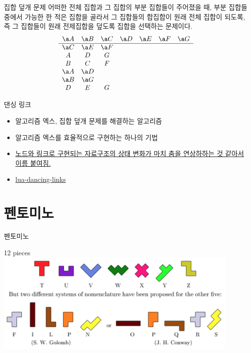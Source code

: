 \documentclass[xcolor=svgnames]{beamer}
\begin{document}
\renewcommand\arraystretch{1.1}
%
\begin{frame}{집합 덮개 문제}
  어떠한 전체 집합과 그 집합의 부분 집합들이 주어졌을 때, 부분 집합들 중에서 가능한 한
  적은 집합을 골라서 그 집합들의 합집합이 원래 전체 집합이 되도록, 즉 그 집합들이
  원래 전제집합을 \alert{덮도록} 집합을 선택하는 문제이다.
  {\large\boldmath
  $$
  \begin{array}{ccccccc}
    \a A & \a B & \a C & \a D & \a E & \a F & \a G\\
    \hline
    \a C & \a E & \a F &&&&\\
    A & D & G &&&&\\
    B & C & F &&&&\\
    \a A & \a D &&&&&\\
    \a B & \a G &&&&&\\
    D & E & G &&&&
  \end{array}
  $$}
\end{frame}

%
\begin{frame}{댄싱 링크}
  \begin{itemize}
  \item \alert{알고리즘 엑스}, 집합 덮개 문제를 해결하는 알고리즘
  \item 알고리즘 엑스를 효율적으로 구현하는 하나의 기법
  \item \href{https://www.youtube.com/watch?v=pN76VICZiKU&start=100}
    {노드와 링크로 구현되는 자료구조의 상태 변화가 마치 춤을 연상하하는 것 같아서
    이름 붙여짐.}
  \item \href{https://github.com/sjnam/lua-dancing-links}
    {lua-dancing-links}
  \end{itemize}
\end{frame}


\section{펜토미노}

%
\begin{frame}{펜토미노}
  \begin{center}
  {\Large 12 pieces} \\
  \includegraphics[height=5cm]{imgs/pentominoes.png}
  \end{center}
\end{frame}
\end{document}
